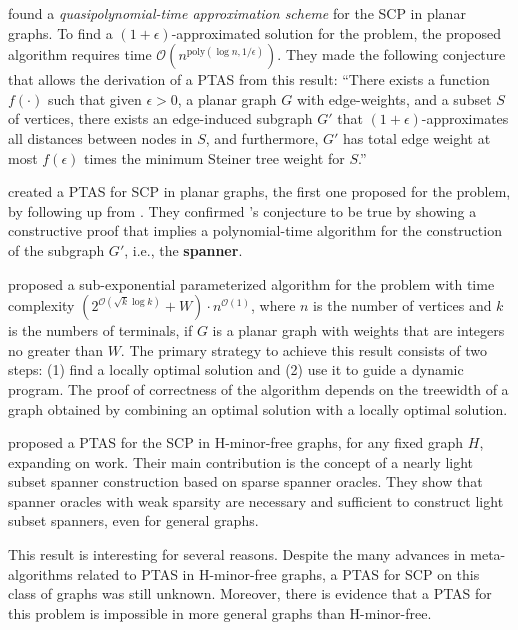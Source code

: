 \cite{Arora1998APA} found a \textit{quasipolynomial-time approximation scheme} for the SCP in planar graphs. To find a \((1 + \epsilon)\)-approximated solution for the problem, the proposed algorithm requires time \(\mathcal{O}(n^{\mathrm{poly}(\log n, 1/\epsilon)})\). They made the following conjecture that allows the derivation of a PTAS from this result: ``There exists a function \(f(\cdot)\) such that given \(\epsilon > 0\), a planar graph \(G\) with edge-weights, and a subset \(S\) of vertices, there exists an edge-induced subgraph \(G'\) that \((1 + \epsilon)\)-approximates all distances between nodes in \(S\), and furthermore, \(G'\) has total edge weight at most \(f(\epsilon)\) times the minimum Steiner tree weight for \(S\).''

\cite{klein2006} created a PTAS for SCP in planar graphs, the first one proposed for the problem, by following up from \cite{Arora1998APA}. They confirmed \citeauthor{Arora1998APA}'s conjecture to be true by showing a constructive proof that implies a polynomial-time algorithm for the construction of the subgraph \(G'\), i.e., the \textbf{spanner}.

\cite{klein2014} proposed a sub-exponential parameterized algorithm for the problem with time complexity \((2^{\mathcal{O}(\sqrt{k} \log{k})} + W) \cdot n^{\mathcal{O}(1)}\), where \(n\) is the number of vertices and \(k\) is the numbers of terminals, if \(G\) is a planar graph with weights that are integers no greater than \(W\). The primary strategy to achieve this result consists of two steps: (1) find a locally optimal solution and (2) use it to guide a dynamic program. The proof of correctness of the algorithm depends on the treewidth of a graph obtained by combining an optimal solution with a locally optimal solution.

\cite{LeSubsetTspPTAS_H_MinorFree} proposed a PTAS for the SCP in H-minor-free graphs, for any fixed graph \(H\), expanding on \cite{eptas-tsp-h-minor-free} work. Their main contribution is the concept of a nearly light subset spanner construction based on sparse spanner oracles. They show that spanner oracles with weak sparsity are necessary and sufficient to construct light subset spanners, even for general graphs.

This result is interesting for several reasons. Despite the many advances in meta-algorithms related to PTAS in H-minor-free graphs, a PTAS for SCP on this class of graphs was still unknown. Moreover, there is evidence that a PTAS for this problem is impossible in more general graphs than H-minor-free.


